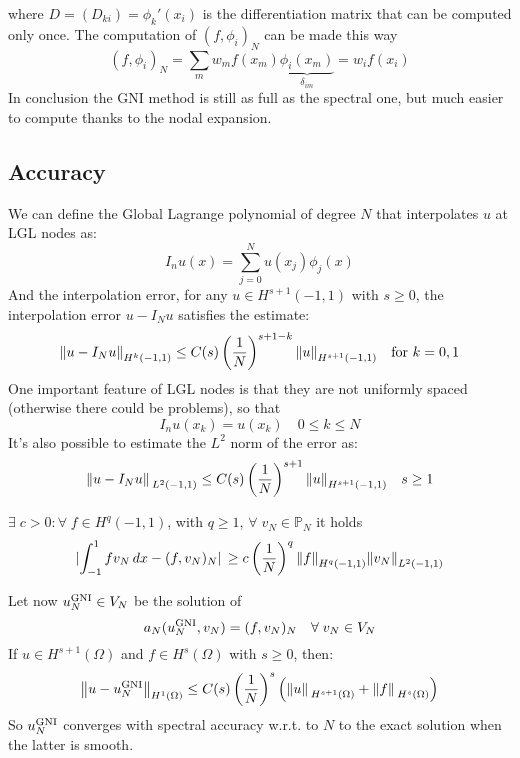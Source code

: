 where \(D = (D_{ki}) = \phi_k'(x_i)\) is the differentiation matrix that can be computed only once. The computation of \((f,\phi_i)_N\) can be made this way 
\[
    (f, \phi_i)_N = \sum_m w_m f(x_m)\underbrace{\phi_i(x_m)}_{\delta_{im}} = w_i f(x_i) 
\]
In conclusion the GNI method is still as full as the spectral one, but much easier to compute thanks to the nodal expansion.
\subsection*{Accuracy}
We can define the Global Lagrange polynomial of degree \(N\) that interpolates \(u\) at LGL nodes as:
\[
    I_nu(x) = \sum_{j=0}^{N}u(x_j)\phi_j(x)
\]
And the interpolation error, for any \(u \in H^{s+1}(-1, 1)\) with \(s \geq 0 \), the interpolation error \(u - I_N u\) satisfies the estimate:
\[
    \norm{u-I_Nu}_{H^k(-1,1)} \leq C(s)\left(\frac{1}{N}\right)^{s+1-k}\norm{u}_{H^{s+1}(-1,1)} \quad \text{for }k = 0,1
\]
One important feature of LGL nodes is that they are not uniformly spaced (otherwise there could be problems), so that 
\[
    I_nu(x_k) = u(x_k) \quad 0 \leq k \leq N
\]
It's also possible to estimate the \(L^2\) norm of the error as:
\[
    \norm*{u - I_N u}_{L^2(-1,1)} \leq C(s) \left(\frac{1}{N}\right)^{s+1} \norm{u}_{H^{s+1}(-1,1)} \quad s \geq 1
\]
\begin{theorem}
    \(\exists \; c > 0 : \forall \; f \in H^q(-1,1)\), with \(q \geq 1\), \(\forall \; v_N \in \mathbb{P}_N\) it holds 
    \[
        \abs*{\int_{-1}^1 f v_N \, dx - (f, v_N)_N} \geq c \left(\frac{1}{N}\right)^q \norm{f}_{H^q(-1,1)} \norm{v_N}_{L^2(-1,1)}
    \]
\end{theorem}
Let now \(u_N^{\text{GNI}} \in V_N\) be the solution of
\[
     a_N(u_N^{\text{GNI}}, v_N) = (f, v_N)_N \quad \forall \; v_N \in V_N
\]
If \(u \in H^{s+1}(\Omega)\) and \(f \in H^{s}(\Omega)\) with \(s \geq 0\), then:
\[
    \norm{u-u_N^{\text{GNI}}}_{H^1(\Omega)} \leq C(s) \left(\frac{1}{N}\right)^s \left(\norm*{u}_{H^{s+1}(\Omega)}+\norm*{f}_{H^s(\Omega)}\right)
\]
So \(u_N^{\text{GNI}}\) converges with spectral accuracy w.r.t. to \(N\) to the exact solution when the latter is smooth.

